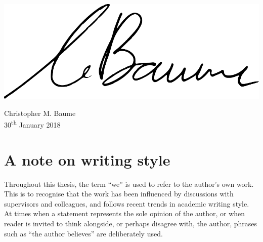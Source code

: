 \documentclass[11pt,a4paper,twoside,openany]{book}
\begin{document}
\vspace{1cm}
\hfill
\includegraphics[width=.3\textwidth]{figs/signature.pdf}
\begin{flushright}
Christopher M. Baume\\
30\textsuperscript{th} January 2018
\end{flushright}



\chapter*{A note on writing style}
Throughout this thesis, the term ``we'' is used to refer to the author's own work. This is to recognise that the work
has been influenced by discussions with supervisors and colleagues, and follows recent trends in academic writing
style.  At times when a statement represents the sole opinion of the author, or when reader is invited to think
alongside, or perhaps disagree with, the author, phrases such as ``the author believes'' are deliberately used.


\tableofcontents



\listoffigures

\listoftables



\pagestyle{fancy}
\mainmatter

\cleardoublepage


\cleardoublepage


\cleardoublepage


\cleardoublepage


\cleardoublepage


\cleardoublepage


\cleardoublepage


\begin{appendices}
  \renewcommand\chaptername{Appendix}
  \cleardoublepage
  
\end{appendices}

\cleardoublepage
\fancyhead[LO]{\leftmark}
\fancyhead[RE]{\rightmark}
\printbibliography
\end{document}
